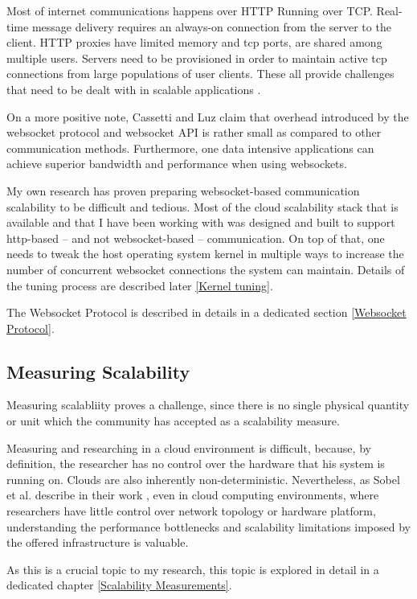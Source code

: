 \documentclass{uvamscse}
\begin{document}
Most of internet communications happens over HTTP Running over TCP. Real-time message delivery requires an always-on connection from the server to the client. HTTP proxies have limited memory and tcp ports, are shared among multiple users. Servers need to be provisioned in order to maintain active tcp connections from large populations of user clients. These all provide challenges that need to be dealt with in scalable applications \cite{PushScale}.

On a more positive note, Cassetti and Luz \cite{WebsApi} claim that overhead introduced by the websocket protocol and websocket API is rather small as compared to other communication methods. Furthermore, one data intensive applications can achieve superior bandwidth and performance when using websockets.

My own research has proven preparing websocket-based communication scalability to be difficult and tedious. Most of the cloud scalability stack that is available and that I have been working with was designed and built to support http-based -- and not websocket-based -- communication. On top of that, one needs to tweak the host operating system kernel in multiple ways to increase the number of concurrent websocket connections the system can maintain. Details of the tuning process are described later \ref{Kernel tuning}.

The Websocket Protocol is described in details in a dedicated section \ref{Websocket Protocol}.

\subsection{Measuring Scalability}
Measuring scalabliity proves a challenge, since there is no single physical quantity or unit which the community has accepted as a scalability measure.

Measuring and researching in a cloud environment is difficult, because, by definition, the researcher has no control over the hardware that his system is running on. Clouds are also inherently non-deterministic. Nevertheless, as Sobel et al. describe in their work \cite{Sobel}, even in cloud computing environments, where researchers have little control over network topology or hardware platform, understanding the performance bottlenecks and scalability limitations imposed by the offered infrastructure is valuable.

As this is a crucial topic to my research, this topic is explored in detail in a dedicated chapter \ref{Scalability Measurements}.
\end{document}
